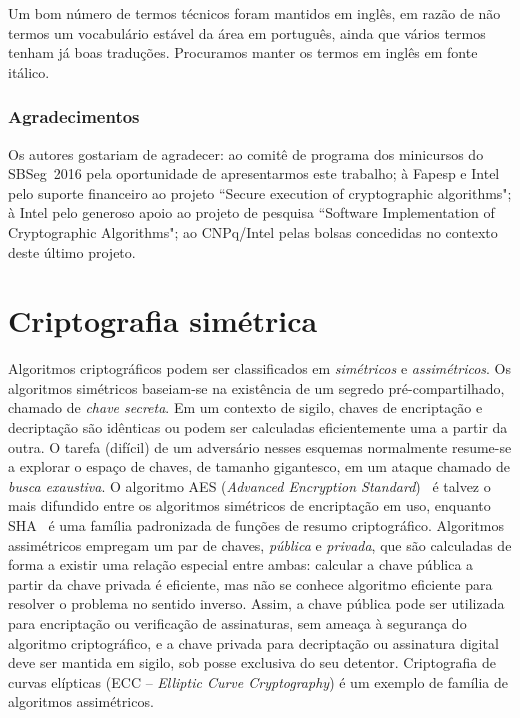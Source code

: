 \documentclass{SBCbookchapter}
\begin{document}
Um bom número de termos técnicos foram mantidos em inglês, em razão de não termos um vocabulário estável da área em português, ainda que vários termos tenham já boas traduções. Procuramos manter os termos em inglês em fonte itálico. 

\subsubsection*{Agradecimentos}
Os autores gostariam de agradecer: ao comitê de programa dos minicursos do SBSeg~2016 pela oportunidade de apresentarmos este trabalho; à Fapesp e Intel pelo suporte financeiro ao projeto ``Secure execution of cryptographic algorithms"; à Intel pelo generoso apoio ao projeto de pesquisa ``Software Implementation of Cryptographic Algorithms"; ao CNPq/Intel pelas bolsas concedidas no contexto deste último projeto.





%
\section{Criptografia simétrica}

Algoritmos criptográficos podem ser classificados em \emph{simétricos} e \emph{assimétricos}. Os algoritmos simétricos baseiam-se na existência de um segredo pré-compartilhado, chamado de \emph{chave secreta}. Em um contexto de sigilo, chaves de encriptação e decriptação são idênticas ou podem ser calculadas eficientemente uma a partir da outra. O tarefa (difícil) de um adversário nesses esquemas normalmente resume-se a explorar o espaço de chaves, de tamanho gigantesco, em um ataque chamado de \emph{busca exaustiva}. O algoritmo AES (\emph{Advanced Encryption Standard})~\cite{AES} é talvez o mais difundido entre os algoritmos simétricos de encriptação em uso, enquanto SHA~\cite{SHA2} é uma família padronizada de funções de resumo criptográfico. Algoritmos assimétricos empregam um par de chaves, \emph{pública} e \emph{privada}, que são calculadas de forma a existir uma relação especial entre ambas: calcular a chave pública a partir da chave privada é eficiente, mas não se conhece algoritmo eficiente para resolver o problema no sentido inverso. Assim, a chave pública pode ser utilizada para encriptação ou verificação de assinaturas, sem ameaça à segurança do algoritmo criptográfico, e a chave privada para decriptação ou assinatura digital deve ser mantida em sigilo, sob posse exclusiva do seu detentor. Criptografia de curvas elípticas (ECC -- \emph{Elliptic Curve Cryptography}) é um exemplo de família de algoritmos assimétricos.
\end{document}
